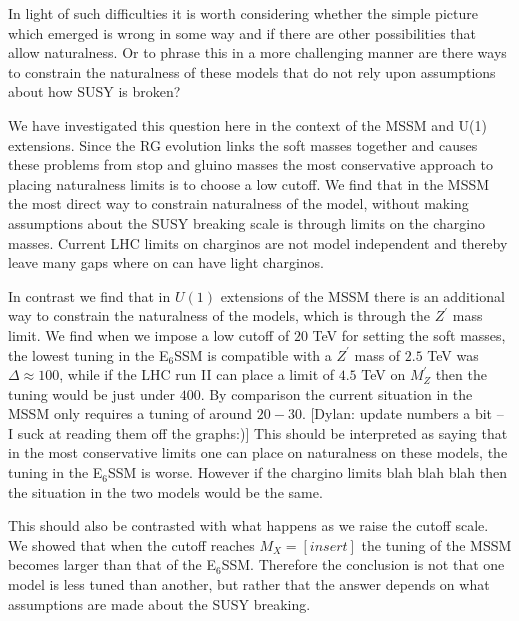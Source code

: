 \documentclass[preprint,amsmath,amssymb,aps,superscriptaddress,prd,showpacs,floatfix,nofootinbib]{revtex4-1}
\begin{document}
In light of such difficulties it is worth considering whether the
simple picture which emerged is wrong in some way and if there are
other possibilities that allow naturalness.  Or to phrase this in a
more challenging manner are there ways to constrain the naturalness of
these models that do not rely upon assumptions about how SUSY is
broken?

We have investigated this question here in the context of the MSSM and
U(1) extensions.  Since the RG evolution links the soft masses
together and causes these problems from stop and gluino masses the
most conservative approach to placing naturalness limits is to choose
a low cutoff. We find that in the MSSM the most direct way to
constrain naturalness of the model, without making assumptions about
the SUSY breaking scale is through limits on the chargino
masses. Current LHC limits on charginos are not model independent and
thereby leave many gaps where on can have light charginos.

In contrast we find that in $U(1)$ extensions of the MSSM there is an
additional way to constrain the naturalness of the models, which is
through the $Z^\prime$ mass limit.  We find when we impose a low
cutoff of $20$ TeV for setting the soft masses, the lowest tuning in
the E$_6$SSM is compatible with a $Z^\prime$ mass of $2.5$ TeV was
$\Delta \approx 100$, while if the LHC run II can place a limit of
$4.5$ TeV on $M_Z^\prime$ then the tuning would be just under $400$.
By comparison the current situation in the MSSM only requires a tuning
of around $20-30$. [Dylan: update numbers a bit -- I suck at reading
  them off the graphs:)] This should be interpreted as saying that in
the most conservative limits one can place on naturalness on these
models, the tuning in the E$_6$SSM is worse.  However if the chargino
limits blah blah blah then the situation in the two models would be
the same.

This should also be contrasted with what happens as we raise the
cutoff scale.  We showed that when the cutoff reaches $M_X =
[insert]$ the tuning of the MSSM becomes larger than that of the
E$_6$SSM.  Therefore the conclusion is not that one model is less
tuned than another, but rather that the answer depends on what
assumptions are made about the SUSY breaking.
\end{document}

